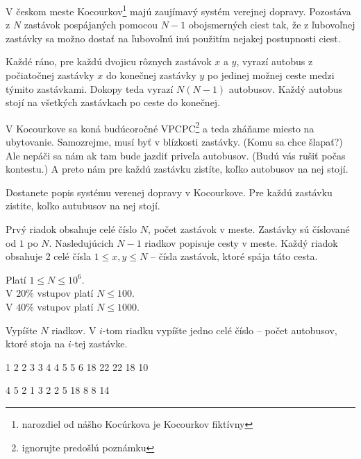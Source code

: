 





V českom meste Kocourkov\footnote{narozdiel od nášho Kocúrkova je Kocourkov fiktívny}
majú zaujímavý systém verejnej dopravy.
Pozostáva z $N$ zastávok pospájaných pomocou $N-1$ obojsmerných ciest tak,
že z ľubovoľnej zastávky sa možno dostať na ľubovoľnú inú
použitím nejakej postupnosti ciest.

Každé ráno, pre každú dvojicu rôznych zastávok $x$ a $y$,
vyrazí autobus z počiatočnej zastávky $x$ do konečnej zastávky $y$
po jedinej možnej ceste medzi týmito zastávkami.
Dokopy teda vyrazí $N(N-1)$ autobusov.
Každý autobus stojí na všetkých zastávkach
po ceste do konečnej.

V Kocourkove sa koná budúcoročné VPCPC\footnote{ignorujte predošlú poznámku}
a teda zháňame miesto na ubytovanie.
Samozrejme, musí byť v blízkosti zastávky.
(Komu sa chce šlapať?)
Ale nepáči sa nám ak tam bude jazdiť priveľa autobusov.
(Budú vás rušiť počas kontestu.)
A preto nám pre každú zastávku zistíte,
koľko autobusov na nej stojí.


Dostanete popis systému verenej dopravy v Kocourkove.
Pre každú zastávku zistite, koľko autubusov na nej stojí.


Prvý riadok obsahuje celé číslo $N$,
počet zastávok v meste.
Zastávky sú číslované od $1$ po $N$.
Nasledujúcich $N-1$ riadkov popisuje cesty v meste.
Každý riadok obsahuje 2 celé čísla $1 \le x, y \le N$
-- čísla zastávok, ktoré spája táto cesta.

\bigskip
\noindent
Platí $1 \leq N \leq 10^6$.\\
V $20\%$ vstupov platí $N \leq 100$.\\
V $40\%$ vstupov platí $N \leq 1000$.


Vypíšte $N$ riadkov.
V $i$-tom riadku vypíšte jedno celé číslo --
počet autobusov, ktoré stoja na $i$-tej zastávke.


1 2
2 3
3 4
4 5
5 6
18
22
22
18
10
\sampleEND

\bigskip

4 5
2 1
3 2
2 5
18
8
8
14
\sampleEND



